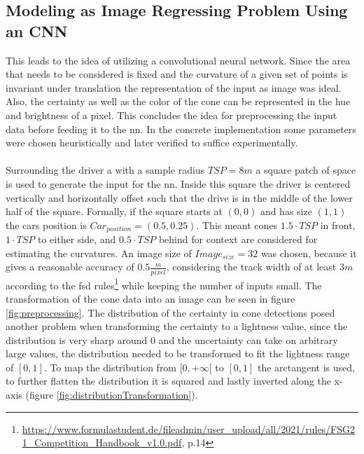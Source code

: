 \subsection{Modeling as Image Regressing Problem Using an CNN}
This leads to the idea of utilizing a convolutional neural network. Since the area that needs to be considered is fixed and the curvature of a given set of points is invariant under translation the representation of the input as image was ideal. Also, the certainty as well as the color of the cone can be represented in the hue and brightness of a pixel. This concludes the idea for preprocessing the input data before feeding it to the \ac{nn}. In the concrete implementation some parameters were chosen heuristically and later verified to suffice experimentally.\\
\\
Surrounding the driver a with a sample radius $TSP = 8m$ a square patch of space is used to generate the input for the \ac{nn}. Inside this square the driver is centered vertically and horizontally offset such that the drive is in the middle of the lower half of the square. Formally, if the square starts at $(0,0)$ and has size $(1,1)$ the cars position is $Car_{position}=(0.5,0.25)$. This meant cones $1.5\cdot TSP$ in front, $1\cdot TSP$ to either side, and $0.5\cdot TSP$ behind for context are considered for estimating the curvatures. An image size of $Image_{size}=32$ was chosen, because it gives a reasonable accuracy of $0.5 \frac{m}{pixel}$, considering the track width of at least $3m$ according to the \ac{fsd} rules\footnote{\url{https://www.formulastudent.de/fileadmin/user_upload/all/2021/rules/FSG21_Competition_Handbook_v1.0.pdf}, p.14} while keeping the number of inputs small. The transformation of the cone data into an image can be seen in figure \ref{fig:preprocessing}. The distribution of the certainty in cone detections posed another problem when transforming the certainty to a lightness value, since the distribution is very sharp around 0 and the uncertainty can take on arbitrary large values, the distribution needed to be transformed to fit the lightness range of $[0,1]$. To map the distribution from $[0,+\infty[$ to $[0,1]$ the arctangent is used, to further flatten the distribution it is squared and lastly inverted along the x-axis (figure \ref{fig:distributionTransformation}). 
